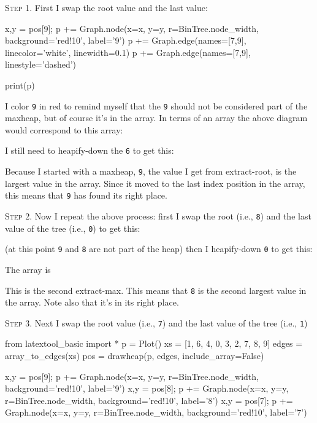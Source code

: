\textsc{Step 1}.
First I swap the root value and the last value:



x,y = pos[9]; p += Graph.node(x=x, y=y, r=BinTree.node_width, background='red!10', label='9')
p += Graph.edge(names=[7,9], linecolor='white', linewidth=0.1)
p += Graph.edge(names=[7,9], linestyle='dashed')

print(p)

I color \texttt{9} in red to remind myself
that the \texttt{9} should not be considered part of the maxheap,
but of course it's in the array.
In terms of an array the above diagram would correspond to this array:



I still need to heapify-down the \texttt{6} to get this:




Because I started with a maxheap, \verb!9!, the value I get from extract-root,
is the largest value in the array.
Since it moved to the last index position in the array,
this means that \verb!9! has found its right place.


\textsc{Step 2}.
Now I repeat the above process:
first I swap the root (i.e., \texttt{8}) and
the last value of the tree (i.e., \texttt{0}) to get this:





(at this point \verb!9! and \verb!8! are not part of the heap)
then I heapify-down \texttt{0} to get this:



The array is



This is the second extract-max.
This means that \verb!8! is the second largest value in the array.
Note also that it's in its right place.


\textsc{Step 3}.
Next I swap the root value (i.e., \texttt{7}) and the last value
of the tree (i.e., \texttt{1})


from latextool_basic import *
p = Plot()
xs = [1, 6, 4, 0, 3, 2, 7, 8, 9]
edges = array_to_edges(xs)
pos = drawheap(p, edges, include_array=False)

x,y = pos[9]; p += Graph.node(x=x, y=y, r=BinTree.node_width, background='red!10', label='9')
x,y = pos[8]; p += Graph.node(x=x, y=y, r=BinTree.node_width, background='red!10', label='8')
x,y = pos[7]; p += Graph.node(x=x, y=y, r=BinTree.node_width, background='red!10', label='7')


